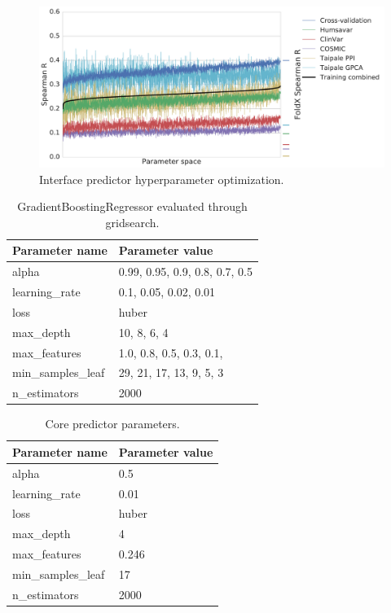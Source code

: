 \begin{figure}[tb]
	\includegraphics[width=0.9\linewidth]{static/elaspic_training_set/machine_learning/gridsearch_interface.pdf}
    \caption[Interface predictor hyperparameter optimization.]{Interface predictor hyperparameter optimization.}
	\label{fig:gridsearch_interface}
\end{figure}



\clearpage

\begin{table}[tb]
	\centering
	\caption[Hyperparameter search space.]{GradientBoostingRegressor evaluated through gridsearch.}
	\label{tab:gridsearch_parameters}
	\begin{tabular}{ l | l }
		\toprule
		Parameter name     & Parameter value                \\
		\midrule
		alpha              & 0.99, 0.95, 0.9, 0.8, 0.7, 0.5 \\
		learning\_rate     & 0.1, 0.05, 0.02, 0.01          \\
		loss               & huber                          \\
		max\_depth         & 10, 8, 6, 4                    \\
		max\_features      & 1.0, 0.8, 0.5, 0.3, 0.1,       \\
		min\_samples\_leaf & 29, 21, 17, 13, 9, 5, 3        \\
		n\_estimators      & 2000                           \\
		\bottomrule
	\end{tabular}
\end{table}

\begin{table}[tb]
	\centering
	\caption[Core predictor hyperparameters.]{Core predictor parameters.}
    \label{tab:core_hyperparameters}
	\begin{tabular}{ l | l }
		\toprule
		Parameter name     & Parameter value \\
		\midrule
		alpha              & 0.5             \\
		learning\_rate     & 0.01            \\
		loss               & huber           \\
		max\_depth         & 4               \\
		max\_features      & 0.246           \\
		min\_samples\_leaf & 17              \\
		n\_estimators      & 2000            \\
		\bottomrule
	\end{tabular}
\end{table}


